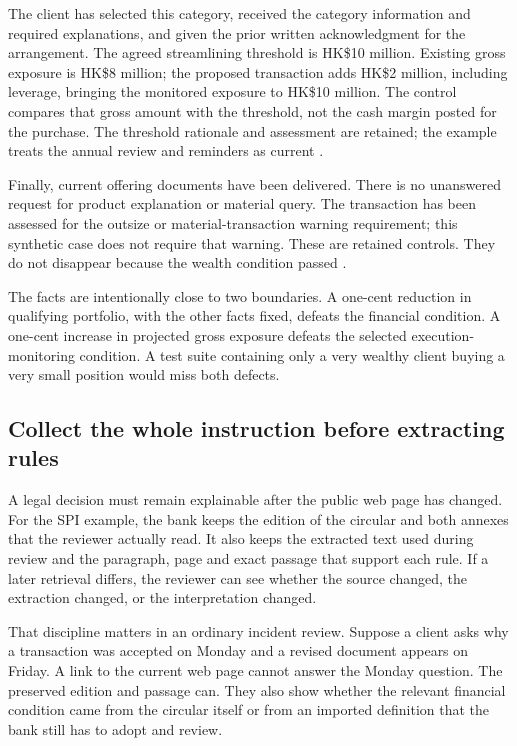 \documentclass[12pt,a4paper,oneside,openany]{book}
\begin{document}
The client has selected this category, received the category information and
required explanations, and given the prior written acknowledgment for the
arrangement. The agreed streamlining threshold is HK\$10 million. Existing
gross exposure is HK\$8 million; the proposed transaction adds HK\$2 million,
including leverage, bringing the monitored exposure to HK\$10 million. The
control compares that gross amount with the threshold, not the cash margin
posted for the purchase. The threshold rationale and assessment are retained;
the example treats the annual review and reminders as current
\citep[Annex 1, paras.~6--8, 12--14; Annex 2, FAQ~7]{sfcspiannex1,sfcspiannex2}.

Finally, current offering documents have been delivered. There is no unanswered
request for product explanation or material query. The transaction has been
assessed for the outsize or material-transaction warning requirement; this
synthetic case does not require that warning. These are retained controls.
They do not disappear because the wealth condition passed
\citep[Annex 1, paras.~8.4, 10.3]{sfcspiannex1}.

The facts are intentionally close to two boundaries. A one-cent reduction in
qualifying portfolio, with the other facts fixed, defeats the financial
condition. A one-cent increase in projected gross exposure defeats the selected
execution-monitoring condition. A test suite containing only a very wealthy
client buying a very small position would miss both defects.

\subsection{Collect the whole instruction before extracting rules}
\label{merge:P-01b-complete-dry-run:02}


A legal decision must remain explainable after the public web page has
changed. For the SPI example, the bank keeps the edition of the circular and
both annexes that the reviewer actually read. It also keeps the extracted text
used during review and the paragraph, page and exact passage that support each
rule. If a later retrieval differs, the reviewer can see whether the source
changed, the extraction changed, or the interpretation changed.

That discipline matters in an ordinary incident review. Suppose a client asks
why a transaction was accepted on Monday and a revised document appears on
Friday. A link to the current web page cannot answer the Monday question. The
preserved edition and passage can. They also show whether the relevant financial
condition came from the circular itself or from an imported definition that the
bank still has to adopt and review.
\end{document}
